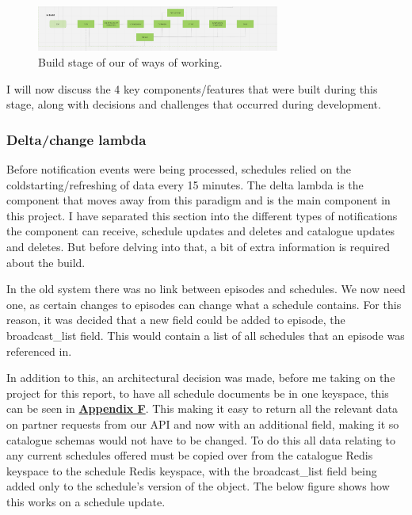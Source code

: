   \begin{figure}[H]
    \centering
    \includegraphics[width=8cm]{assets/workflow/build.png}
    \caption{Build stage of our of ways of working.}
    \label{fig:workflowBuild}
  \end{figure}

  I will now discuss the 4 key components/features that were built during this stage, along with decisions and challenges that occurred during development.

  \newpage
  \subsubsection{Delta/change lambda}
  Before notification events were being processed, schedules relied on the coldstarting/refreshing of data every 15 minutes. The delta lambda is 
  the component that moves away from this paradigm and is the main component in this project. I have separated this section into the different types
  of notifications the component can receive, schedule updates and deletes and catalogue updates and deletes. But before delving into that, a bit of extra
  information is required about the build.

  \vspace{0.2cm}
  In the old system there was no link between episodes and schedules. We now need one, as certain changes to episodes can change what a schedule 
  contains. For this reason, it was decided that a new field could be added to episode, the broadcast\_list field. This would contain a list of all 
  schedules that an episode was referenced in.

  In addition to this, an architectural decision was made, before me taking on the project for this report, to have all schedule documents be in one keyspace,
  this can be seen in \hyperref[sec:AppendixF]{\textbf{Appendix F}}. 
  This making it easy to return all the relevant data on partner requests from our API and now with an additional field, making it so catalogue schemas would 
  not have to be changed. To do this all data relating to any current schedules offered must be copied over from the catalogue Redis keyspace to the schedule
  Redis keyspace, with the broadcast\_list field being added only to the schedule's version of the object. The below figure shows how this works on a
  schedule update.

